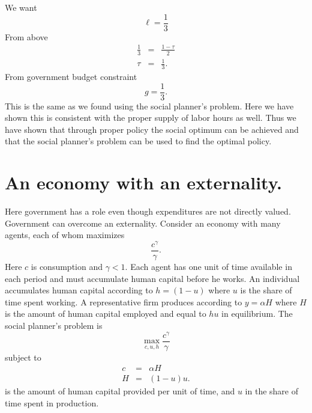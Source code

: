 \documentclass{sebase}
\begin{document}
We want 
\begin{equation*}
\ell =\frac{1}{3}
\end{equation*}%
From above%
\begin{eqnarray*}
\frac{1}{3} &=&\frac{1-\tau }{2} \\
\tau &=&\frac{1}{3}.
\end{eqnarray*}%
From government budget constraint%
\begin{equation*}
g=\frac{1}{3}.
\end{equation*}%
This is the same as we found using the social planner's problem. Here we
have shown this is consistent with the proper supply of labor hours as well.
Thus we have shown that through proper policy the social optimum can be
achieved and that the social planner's problem can be used to find the
optimal policy. \pagebreak

\section{An economy with an externality.}

Here government has a role even though expenditures are not directly valued.
Government can overcome an externality. Consider an economy with many
agents, each of whom maximizes 
\begin{equation*}
\frac{c^{\gamma }}{\gamma }.
\end{equation*}%
Here $c$ is consumption and $\gamma <1.$ Each agent has one unit of time
available in each period and must accumulate human capital before he works.
An individual accumulates human capital according to $h=\left( 1-u\right) $
where $u$ is the share of time spent working$.$ A representative firm
produces according to $y=\alpha H$ where $H$ is the amount of human capital
employed and equal to $hu$ in equilibrium. The social planner's problem is $%
\ $%
\begin{equation*}
\underset{c,u,h}{\max }\frac{c^{\gamma }}{\gamma }
\end{equation*}%
subject to 
\begin{eqnarray*}
c &=&\alpha H \\
H &=&\left( 1-u\right) u.
\end{eqnarray*}%
is the amount of human capital provided per unit of time, and $u$ in the
share of time spent in production. \pagebreak
\end{document}
